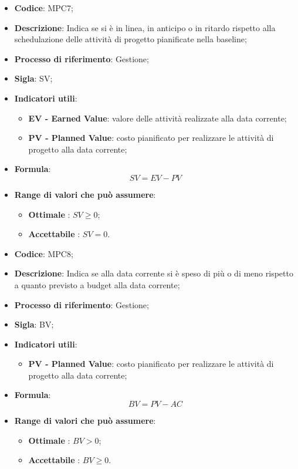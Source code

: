 \vspace{-1cm}
\begin{itemize}
	\item \textbf{Codice}: MPC7;
	\item \textbf{Descrizione}: Indica se si è in linea, in anticipo o in ritardo rispetto alla schedulazione delle attività di progetto pianificate nella baseline;
	\item \textbf{Processo di riferimento}: Gestione;
	\item \textbf{Sigla}: SV;
	\item \textbf{Indicatori utili}: 
		\begin{itemize}
		\item \textbf{EV - Earned Value}: valore delle attività realizzate alla data corrente;
			\item \textbf{PV - Planned Value}: costo pianificato per realizzare le attività di progetto alla data corrente;
		\end{itemize}
	\item \textbf{Formula}: \[ SV = EV - PV \]
	\item \textbf{Range di valori che può assumere}: 
		\begin{itemize}
			\item \textbf{Ottimale} : $SV \geq 0$;
			\item \textbf{Accettabile} : $SV = 0$.
		\end{itemize}
\end{itemize}
\vspace{-1cm}
\begin{itemize}
	\item \textbf{Codice}: MPC8;
	\item \textbf{Descrizione}: Indica se alla data corrente si è speso di più o di meno rispetto a quanto previsto a budget alla data corrente;
	\item \textbf{Processo di riferimento}: Gestione;
	\item \textbf{Sigla}: BV;
	\item \textbf{Indicatori utili}: 
		\begin{itemize}
			\item \textbf{PV - Planned Value}: costo pianificato per realizzare le attività di progetto alla data corrente;
		\end{itemize}
	\item \textbf{Formula}: \[ BV = PV - AC\]
	\item \textbf{Range di valori che può assumere}: 
		\begin{itemize}
			\item \textbf{Ottimale} : $BV > 0$;
			\item \textbf{Accettabile} : $BV \geq 0$.
		\end{itemize}
\end{itemize}

